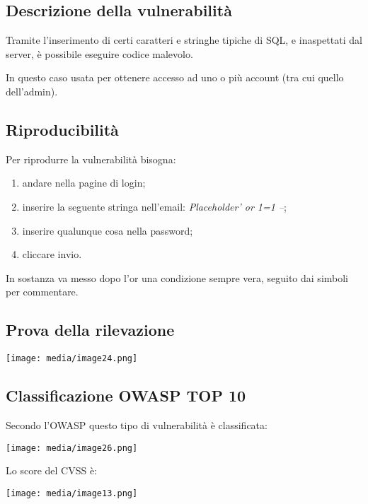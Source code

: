 \subsection{Descrizione della
vulnerabilità}\label{descrizione-della-vulnerabilituxe0}

Tramite l'inserimento di certi caratteri e stringhe tipiche di SQL, e
inaspettati dal server, è possibile eseguire codice malevolo.

In questo caso usata per ottenere accesso ad uno o più account (tra cui
quello dell'admin).

\subsection{Riproducibilità}\label{riproducibilituxe0}

Per riprodurre la vulnerabilità bisogna:

\begin{enumerate}
\def\labelenumi{\arabic{enumi}.}
\item
  andare nella pagine di login;
\item
  inserire la seguente stringa nell'email: \emph{Placeholder' or 1=1
  --};
\item
  inserire qualunque cosa nella password;
\item
  cliccare invio.
\end{enumerate}

In sostanza va messo dopo l'or una condizione sempre vera, seguito dai
simboli per commentare.

\subsection{Prova della rilevazione}\label{prova-della-rilevazione}

\texttt{[image: media/image24.png]}

\subsection{Classificazione OWASP TOP
10}\label{classificazione-owasp-top-10}

Secondo l'OWASP questo tipo di vulnerabilità è classificata:

\texttt{[image: media/image26.png]}

Lo score del CVSS è:

\texttt{[image: media/image13.png]}

